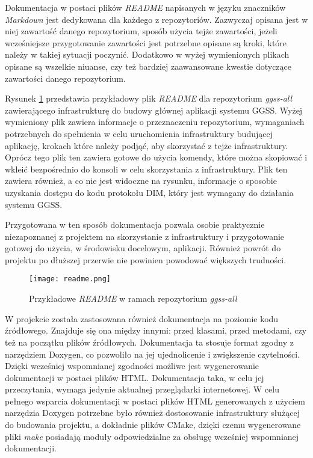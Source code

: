Dokumentacja w postaci plików \emph{README} napisanych w języku znaczników \emph{Markdown} jest dedykowana dla każdego z repozytoriów. Zazwyczaj opisana jest w niej zawartość danego repozytorium, sposób użycia tejże zawartości, jeżeli wcześniejsze przygotowanie zawartości jest potrzebne opisane są kroki, które należy w takiej sytuacji poczynić. Dodatkowo w wyżej wymienionych plikach opisane są wszelkie niuanse, czy też bardziej zaawansowane kwestie dotyczące zawartości danego repozytorium.

Rysunek \ref{fig:readme} przedstawia przykładowy plik \emph{README} dla repozytorium \emph{ggss-all} zawierającego infrastrukturę do budowy głównej aplikacji systemu GGSS. Wyżej wymieniony plik zawiera informacje o przeznaczeniu repozytorium, wymaganiach potrzebnych do spełnienia w celu uruchomienia infrastruktury budującej aplikację, krokach które należy podjąć, aby skorzystać z tejże infrastruktury. Oprócz tego plik ten zawiera gotowe do użycia komendy, które można skopiować i wkleić bezpośrednio do konsoli w celu skorzystania z infrastruktury. Plik ten zawiera również, a co nie jest widoczne na rysunku, informacje o sposobie uzyskania dostępu do kodu protokołu DIM, który jest wymagany do działania systemu GGSS.


Przygotowana w ten sposób dokumentacja pozwala osobie praktycznie niezapoznanej z projektem na skorzystanie z infrastruktury i przygotowanie gotowej do użycia, w środowisku docelowym, aplikacji. Również powrót do projektu po dłuższej przerwie nie powinien powodować większych trudności.
\newpage
\begin{figure}[H]
    \centering
    \texttt{[image: readme.png]}
    \caption{Przykładowe \emph{README} w ramach repozytorium \emph{ggss-all}}
    \label{fig:readme}
\end{figure} %

W projekcie została zastosowana również dokumentacja na poziomie kodu źródłowego. Znajduje się ona między innymi: przed klasami, przed metodami, czy też na początku plików źródłowych. Dokumentacja ta stosuje format zgodny z narzędziem Doxygen, co pozwoliło na jej ujednolicenie i zwiększenie czytelności. Dzięki wcześniej wspomnianej zgodności możliwe jest wygenerowanie dokumentacji w postaci plików HTML. Dokumentacja taka, w celu jej przeczytania, wymaga jedynie aktualnej przeglądarki internetowej. W celu pełnego wsparcia dokumentacji w postaci plików HTML generowanych z użyciem narzędzia Doxygen potrzebne było również dostosowanie infrastruktury służącej do budowania projektu, a dokładnie plików CMake, dzięki czemu wygenerowane pliki \emph{make} posiadają moduły odpowiedzialne za obsługę wcześniej wspomnianej dokumentacji.

